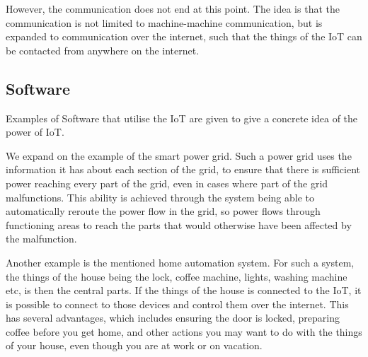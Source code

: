 However, the communication does not end at this point.
The idea is that the communication is not limited to machine-machine communication, but is expanded to communication over the internet, such that the things of the IoT can be contacted from anywhere on the internet.

\subsection{Software}
Examples of Software that utilise the IoT are given to give a concrete idea of the power of IoT.

We expand on the example of the smart power grid.
Such a power grid uses the information it has about each section of the grid, to ensure that there is sufficient power reaching every part of the grid, even in cases where part of the grid malfunctions.
This ability is achieved through the system being able to automatically reroute the power flow in the grid, so power flows through functioning areas to reach the parts that would otherwise have been affected by the malfunction.

Another example is the mentioned home automation system.
For such a system, the things of the house being the lock, coffee machine, lights, washing machine etc, is then the central parts.
If the things of the house is connected to the IoT, it is possible to connect to those devices and control them over the internet.
This has several advantages, which includes ensuring the door is locked, preparing coffee before you get home, and other actions you may want to do with the things of your house, even though you are at work or on vacation.